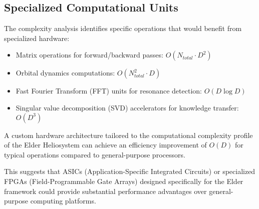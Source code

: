 \subsection{Specialized Computational Units}

The complexity analysis identifies specific operations that would benefit from specialized hardware:

\begin{itemize}
    \item Matrix operations for forward/backward passes: $O(N_{total} \cdot D^2)$
    \item Orbital dynamics computations: $O(N_{total}^2 \cdot D)$
    \item Fast Fourier Transform (FFT) units for resonance detection: $O(D \log D)$
    \item Singular value decomposition (SVD) accelerators for knowledge transfer: $O(D^3)$
\end{itemize}



\begin{theorem}
A custom hardware architecture tailored to the computational complexity profile of the Elder Heliosystem can achieve an efficiency improvement of $O(D)$ for typical operations compared to general-purpose processors.
\end{theorem}

This suggests that ASICs (Application-Specific Integrated Circuits) or specialized FPGAs (Field-Programmable Gate Arrays) designed specifically for the Elder framework could provide substantial performance advantages over general-purpose computing platforms.